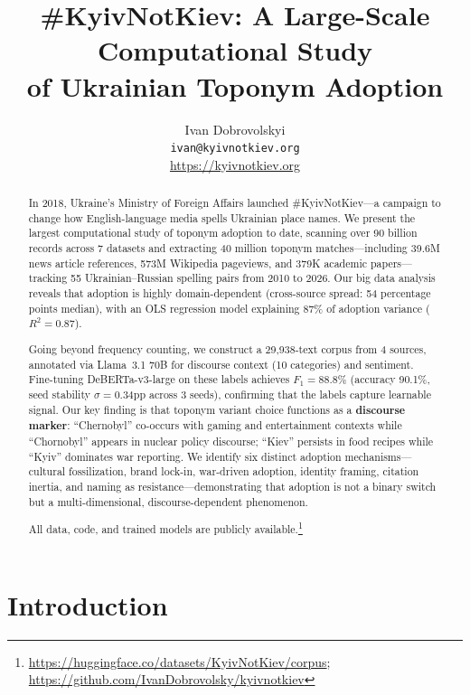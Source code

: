 \documentclass{article}
\title{\#KyivNotKiev: A Large-Scale Computational Study\\of Ukrainian Toponym Adoption}
\author{Ivan Dobrovolskyi\\
  \texttt{ivan@kyivnotkiev.org}\\
  \url{https://kyivnotkiev.org}}
\date{}
\begin{document}
\maketitle

\begin{abstract}
In 2018, Ukraine's Ministry of Foreign Affairs launched \#KyivNotKiev---a campaign to change how English-language media spells Ukrainian place names. We present the largest computational study of toponym adoption to date, scanning over 90 billion records across 7 datasets and extracting 40 million toponym matches---including 39.6M news article references, 573M Wikipedia pageviews, and 379K academic papers---tracking 55 Ukrainian--Russian spelling pairs from 2010 to 2026. Our big data analysis reveals that adoption is highly domain-dependent (cross-source spread: 54 percentage points median), with an OLS regression model explaining 87\% of adoption variance ($R^2 = 0.87$).

Going beyond frequency counting, we construct a 29,938-text corpus from 4 sources, annotated via Llama~3.1 70B for discourse context (10 categories) and sentiment. Fine-tuning DeBERTa-v3-large on these labels achieves $F_1 = 88.8\%$ (accuracy 90.1\%, seed stability $\sigma = 0.34$pp across 3 seeds), confirming that the labels capture learnable signal. Our key finding is that toponym variant choice functions as a \textbf{discourse marker}: ``Chernobyl'' co-occurs with gaming and entertainment contexts while ``Chornobyl'' appears in nuclear policy discourse; ``Kiev'' persists in food recipes while ``Kyiv'' dominates war reporting. We identify six distinct adoption mechanisms---cultural fossilization, brand lock-in, war-driven adoption, identity framing, citation inertia, and naming as resistance---demonstrating that adoption is not a binary switch but a multi-dimensional, discourse-dependent phenomenon.

All data, code, and trained models are publicly available.\footnote{\url{https://huggingface.co/datasets/KyivNotKiev/corpus}; \url{https://github.com/IvanDobrovolsky/kyivnotkiev}}
\end{abstract}

\section{Introduction}
\label{sec:intro}
\end{document}

